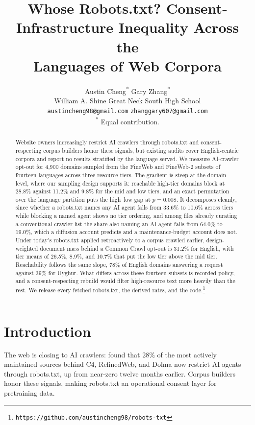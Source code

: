 \documentclass[11pt]{article}
\title{Whose Robots.txt? Consent-Infrastructure Inequality Across the\\Languages of Web Corpora}
\author{
Austin Cheng\textsuperscript{*} \quad Gary Zhang\textsuperscript{*} \\
William A. Shine Great Neck South High School \\
\texttt{austincheng98@gmail.com} \quad \texttt{zhanggary607@gmail.com} \\
\textsuperscript{*} Equal contribution.
}
\begin{document}
\maketitle

\begin{abstract}
Website owners increasingly restrict AI crawlers through robots.txt and consent-respecting corpus builders honor these signals, but existing audits cover English-centric corpora and report no results stratified by the language served. We measure AI-crawler opt-out for 4,900 domains sampled from the FineWeb and FineWeb-2 subsets of fourteen languages across three resource tiers. The gradient is steep at the domain level, where our sampling design supports it: reachable high-tier domains block at 28.8\% against 11.2\% and 9.8\% for the mid and low tiers, and an exact permutation over the language partition puts the high--low gap at $p = 0.008$. It decomposes cleanly, since whether a robots.txt names any AI agent falls from 33.6\% to 10.6\% across tiers while blocking a named agent shows no tier ordering, and among files already curating a conventional-crawler list the share also naming an AI agent falls from 64.0\% to 19.0\%, which a diffusion account predicts and a maintenance-budget account does not. Under today's robots.txt applied retroactively to a corpus crawled earlier, design-weighted document mass behind a Common Crawl opt-out is 31.2\% for English, with tier means of 26.5\%, 8.9\%, and 10.7\% that put the low tier above the mid tier. Reachability follows the same slope, 78\% of English domains answering a request against 39\% for Uyghur. What differs across these fourteen subsets is recorded policy, and a consent-respecting rebuild would filter high-resource text more heavily than the rest. We release every fetched robots.txt, the derived rates, and the code.\footnote{\nolinkurl{https://github.com/austincheng98/robots-txt}}
\end{abstract}

\section{Introduction}

The web is closing to AI crawlers: \citet{longpre2024consent} found that 28\% of the most actively maintained sources behind C4, RefinedWeb, and Dolma now restrict AI agents through robots.txt, up from near-zero twelve months earlier. Corpus builders honor these signals, making robots.txt an operational consent layer for pretraining data.
\end{document}

